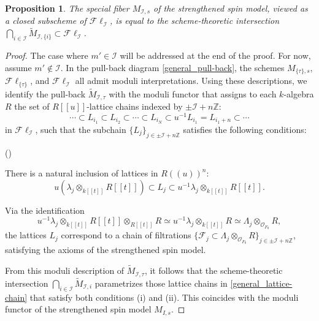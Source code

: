 \documentclass[pdflatex,sn-mathphys-num]{sn-jnl}%
\theoremstyle{thmstyleone}%
\newtheorem{proposition}[subsubsection]{Proposition}%
\theoremstyle{thmstyletwo}%
\numberwithin{equation}{subsection}
\theoremstyle{thmstylethree}%
\newcommand{\BZ}{\ensuremath{\mathbb{Z}}\xspace}
\newcommand{\CF}{\ensuremath{\mathcal{F}}\xspace}
\newcommand{\CI}{\ensuremath{\mathcal{I}}\xspace}
\newcommand{\CO}{\ensuremath{\mathcal{O}}\xspace}
\newcommand{\wt}{\widetilde}
\newcommand{\Fl}{\mathcal{F}\ell}
\newenvironment{altenumerate}
	{\begin{list}
			{(\theenumi) }
			{\usecounter{enumi}
				\setlength{\labelwidth}{0pt}
				\setlength{\labelsep}{0pt}
				\setlength{\leftmargin}{0pt}
				\setlength{\itemsep}{\the\smallskipamount}
				\renewcommand{\theenumi}{\roman{enumi}}
		}}
		{\end{list}}
\begin{document}
\begin{proposition}\label{general:intersection-of-tilde-M}
The special fiber $M_{\CI,s}$ of the strengthened spin model, viewed as a closed subscheme of $\Fl_\CI$, is equal to the scheme-theoretic intersection $\bigcap_{i\in \CI}\wt{M}_{\CI,\{i\}}\subset \Fl_\CI$.
\end{proposition}
\begin{proof}
The case where $m'\in \CI$ will be addressed at the end of the proof. For now, assume $m'\not\in \CI$.
In the pull-back diagram \eqref{general_pull-back}, the schemes $M_{\{\tau\},s}$, $\Fl_{\{\tau\}}$, and $\Fl_\CI$ all admit moduli interpretations. Using these descriptions, we identify the pull-back $\wt{M}_{\CI,\tau}$ with the moduli functor that assigns to each $k$-algebra $R$ the set of $R[[u]]$-lattice chains indexed by $\pm \CI+n\BZ$:
\begin{equation}\label{general_lattice-chain}
    \cdots\subset L_{i_1}\subset L_{i_2}\subset\cdots\subset L_{i_N}\subset u^{-1}L_{i_1}=L_{i_{1}+n}\subset\cdots
\end{equation}
in $\Fl_\CI$, such that the subchain $\{L_j\}_{j\in\pm\CI+n\BZ}$ satisfies the following conditions:
\begin{altenumerate}
\item There is a natural inclusion of lattices in $R((u))^n$:
\begin{equation*}
    u\left(\lambda_j\otimes_{k[[t]]}R[[t]]\right)\subset L_j\subset u^{-1}\lambda_j\otimes_{k[[t]]}R[[t]].
\end{equation*}

\item Via the identification 
\begin{equation*}
    u^{-1}\lambda_j\otimes_{k[[t]]}R[[t]]\otimes_{R[[t]]} R\simeq u^{-1}\lambda_j\otimes_{k[[t]]}R\simeq \Lambda_j\otimes_{\CO_{F_0}}R,
\end{equation*}
the lattices $L_j$ correspond to a chain of filtrations $\{\CF_j\subset \Lambda_j\otimes_{\CO_{F_0}}R\}_{j\in\pm\CI+n\BZ}$, satisfying the axioms of the strengthened spin model.
\end{altenumerate}

From this moduli description of $\wt{M}_{\CI,\tau}$, it follows that the scheme-theoretic intersection $\bigcap_{i\in\CI}\wt{M}_{\CI,i}$ parametrizes those lattice chains in \eqref{general_lattice-chain} that satisfy both conditions (i) and (ii). This coincides with the moduli functor of the strengthened spin model $M_{I,s}$.


\end{proof}
\end{document}
